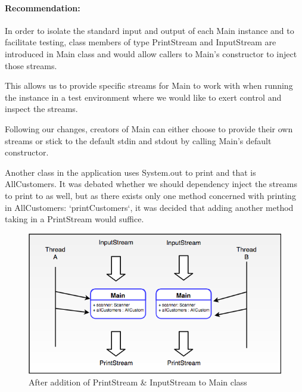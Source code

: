 \paragraph{Recommendation:}
In order to isolate the standard input and output of each Main instance and to facilitate testing, class members of type PrintStream and InputStream are introduced in Main class and would allow callers to Main's constructor to inject those streams.
\par
This allows us to provide specific streams for Main to work with when running the instance in a test environment where we would like to exert control and inspect the streams. 
\par 
Following our changes, creators of Main can either choose to provide their own streams or stick to the default stdin and stdout by calling Main's default constructor. 
\par
Another class in the application uses System.out to print and that is AllCustomers. It was debated whether we should dependency inject the streams to print to as well, but as there exists only one method concerned with printing in AllCustomers: `printCustomers`, it was decided that adding another  method taking in a PrintStream would suffice.
\begin{figure}[H]
	\centering
	\includegraphics[scale=0.4]{res/STE-Page-3-original.png}
	\caption{After addition of PrintStream \& InputStream to Main class}
\end{figure}
\par

